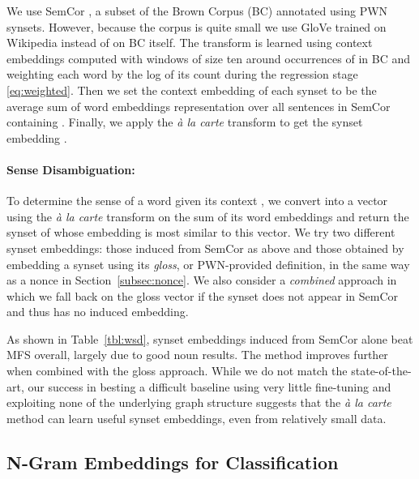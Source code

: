 \documentclass[11pt,a4paper]{article}
\begin{document}
We use SemCor \cite{Langone:04}, a subset of the Brown Corpus (BC) \cite{Francis:79} annotated using PWN synsets.
However, because the corpus is quite small we use GloVe trained on Wikipedia instead of on BC itself.
The transform  is learned using context embeddings  computed with windows of size ten around occurrences of  in BC and weighting each word by the log of its count during the regression stage \eqref{eq:weighted}.
Then we set the context embedding  of each synset  to be the average sum of word embeddings representation over all sentences in SemCor containing .
Finally, we apply the {\em\` a la carte} transform to get the synset embedding .

\paragraph{Sense Disambiguation:}
To determine the sense of a word  given its context , we convert  into a vector using the {\em\`a la carte} transform  on the sum of its word embeddings and return the synset  of  whose embedding  is most similar to this vector.
We try two different synset embeddings: those induced from SemCor as above and those obtained by embedding a synset using its {\em gloss}, or PWN-provided definition, in the same way as a nonce in Section~\ref{subsec:nonce}.
We also consider a {\em combined} approach in which we fall back on the gloss vector if the synset does not appear in SemCor and thus has no induced embedding.

As shown in Table~\ref{tbl:wsd}, synset embeddings induced from SemCor alone beat MFS overall, largely due to good noun results.
The method improves further when combined with the gloss approach.
While we do not match the state-of-the-art, our success in besting a difficult baseline using very little fine-tuning and exploiting none of the underlying graph structure suggests that the {\em\`a la carte} method can learn useful synset embeddings, even from relatively small data.

\subsection{N-Gram Embeddings for Classification}
\end{document}
